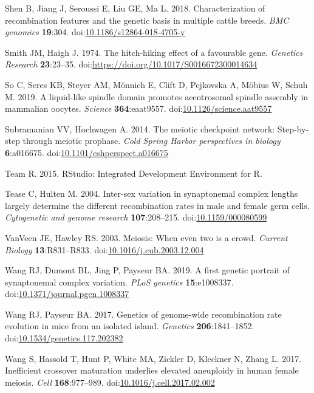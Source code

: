 \documentclass[
]{article}
\begin{document}
\leavevmode\hypertarget{ref-Shen2018_cattle}{}%
Shen B, Jiang J, Seroussi E, Liu GE, Ma L. 2018. Characterization of
recombination features and the genetic basis in multiple cattle breeds.
\emph{BMC genomics} \textbf{19}:304.
doi:\href{https://doi.org/10.1186/s12864-018-4705-y}{10.1186/s12864-018-4705-y}

\leavevmode\hypertarget{ref-smith1974}{}%
Smith JM, Haigh J. 1974. The hitch-hiking effect of a favourable gene.
\emph{Genetics Research} \textbf{23}:23--35.
doi:\href{https://doi.org/https://doi.org/10.1017/S0016672300014634}{https://doi.org/10.1017/S0016672300014634}

\leavevmode\hypertarget{ref-So2019}{}%
So C, Seres KB, Steyer AM, Mönnich E, Clift D, Pejkovska A, Möbius W,
Schuh M. 2019. A liquid-like spindle domain promotes acentrosomal
spindle assembly in mammalian oocytes. \emph{Science}
\textbf{364}:eaat9557.
doi:\href{https://doi.org/10.1126/science.aat9557}{10.1126/science.aat9557}

\leavevmode\hypertarget{ref-subramanian2014}{}%
Subramanian VV, Hochwagen A. 2014. The meiotic checkpoint network:
Step-by-step through meiotic prophase. \emph{Cold Spring Harbor
perspectives in biology} \textbf{6}:a016675.
doi:\href{https://doi.org/10.1101/cshperspect.a016675}{10.1101/cshperspect.a016675}

\leavevmode\hypertarget{ref-Rstudio}{}%
Team R. 2015. RStudio: Integrated Development Environment for R.

\leavevmode\hypertarget{ref-tease2004}{}%
Tease C, Hulten M. 2004. Inter-sex variation in synaptonemal complex
lengths largely determine the different recombination rates in male and
female germ cells. \emph{Cytogenetic and genome research}
\textbf{107}:208--215.
doi:\href{https://doi.org/10.1159/000080599}{10.1159/000080599}

\leavevmode\hypertarget{ref-vanVeen2003}{}%
VanVeen JE, Hawley RS. 2003. Meiosis: When even two is a crowd.
\emph{Current Biology} \textbf{13}:R831--R833.
doi:\href{https://doi.org/10.1016/j.cub.2003.12.004}{10.1016/j.cub.2003.12.004}

\leavevmode\hypertarget{ref-wang2019_SC}{}%
Wang RJ, Dumont BL, Jing P, Payseur BA. 2019. A first genetic portrait
of synaptonemal complex variation. \emph{PLoS genetics}
\textbf{15}:e1008337.
doi:\href{https://doi.org/10.1371/journal.pgen.1008337}{10.1371/journal.pgen.1008337}

\leavevmode\hypertarget{ref-Wang2017island}{}%
Wang RJ, Payseur BA. 2017. Genetics of genome-wide recombination rate
evolution in mice from an isolated island. \emph{Genetics}
\textbf{206}:1841--1852.
doi:\href{https://doi.org/10.1534/genetics.117.202382}{10.1534/genetics.117.202382}

\leavevmode\hypertarget{ref-wang2017inefficient}{}%
Wang S, Hassold T, Hunt P, White MA, Zickler D, Kleckner N, Zhang L.
2017. Inefficient crossover maturation underlies elevated aneuploidy in
human female meiosis. \emph{Cell} \textbf{168}:977--989.
doi:\href{https://doi.org/10.1016/j.cell.2017.02.002}{10.1016/j.cell.2017.02.002}
\end{document}
